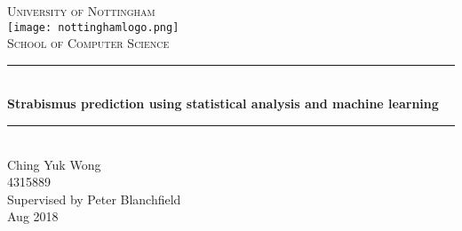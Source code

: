 \begin{titlepage}

\newcommand{\HRule}{\rule{\linewidth}{0.5mm}}

\center


\textsc{\LARGE University of Nottingham}\\[0.8cm] 
\texttt{[image: nottinghamlogo.png]}\\[1cm]
\textsc{\Large School of Computer Science}\\[0.5cm] 



\HRule \\[0.4cm]
{ \huge \textbf{Strabismus prediction using statistical analysis and machine learning} }\\[0.1cm]

\HRule \\[1cm]
\Large 
Ching Yuk Wong\\
4315889\\[0.5cm]
\Large Supervised by Peter Blanchfield\\[3cm]

{\large Aug 2018}\\
\vfill

\end{titlepage}


